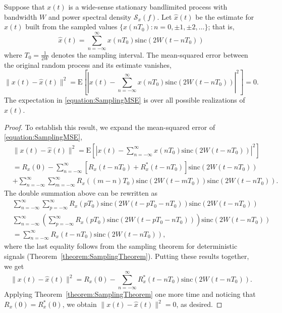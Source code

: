 \begin{theorem} \label{theorem:SamplingRandomSignals}
Suppose that $x(t)$ is a wide-sense stationary bandlimited process with bandwidth $W$ and power spectral density $\mathcal{S}_x (f)$.
Let $\hat{x}(t)$ be the estimate for $x(t)$ built from the sampled values $\{ x(nT_0) : n = 0, \pm 1, \pm 2, \ldots \}$; that is,
\begin{equation*}
\hat{x}(t) = \sum_{n=-\infty}^{\infty} x(nT_0) \mathrm{sinc} (2 W (t - nT_0))
\end{equation*}
where $T_0 = \frac{1}{2W}$ denotes the sampling interval.
The mean-squared error between the original random process and its estimate vanishes,
\begin{equation} \label{equation:SamplingMSE}
\| x(t) - \hat{x}(t) \|^2
= \mathrm{E} \left[ \left| x(t) - \sum_{n=-\infty}^{\infty}
x(nT_0) \mathrm{sinc} (2 W (t - nT_0)) \right|^2 \right] = 0 .
\end{equation}
The expectation in \eqref{equation:SamplingMSE} is over all possible realizations of $x(t)$.
\end{theorem}
\begin{proof}
To establish this result, we expand the mean-squared error of \eqref{equation:SamplingMSE},
\begin{equation*}
\begin{split}
&\| x(t) - \hat{x}(t) \|^2
= \mathrm{E} \left[ \left| x(t) - \sum_{n=-\infty}^{\infty} x(nT_0)
\mathrm{sinc}(2 W (t - nT_0)) \right|^2 \right] \\
&= R_x(0) - \sum_{n=-\infty}^{\infty} [ R_x(t-nT_0) + R_x^*(t-nT_0) ]
\mathrm{sinc}(2 W (t - nT_0)) \\
&+ \sum_{n=-\infty}^{\infty} \sum_{m=-\infty}^{\infty} R_x((m-n)T_0)
\mathrm{sinc}(2 W (t - mT_0)) \mathrm{sinc}(2 W (t - nT_0)) .
\end{split}
\end{equation*}
The double summation above can be rewritten as
\begin{equation*}
\begin{split}
&\sum_{n=-\infty}^{\infty} \sum_{p=-\infty}^{\infty} R_x(pT_0)
\mathrm{sinc}(2 W (t - pT_0 - nT_0)) \mathrm{sinc}(2 W (t - nT_0)) \\
&\sum_{n=-\infty}^{\infty} \left( \sum_{p=-\infty}^{\infty} R_x(pT_0)
\mathrm{sinc}(2 W (t - pT_0 - nT_0)) \right) \mathrm{sinc}(2 W (t - nT_0)) \\
&= \sum_{n=-\infty}^{\infty} R_x(t - nT_0) \mathrm{sinc}(2 W (t - nT_0)) ,
\end{split}
\end{equation*}
where the last equality follows from the sampling theorem for deterministic signals (Theorem~\ref{theorem:SamplingTheorem}).
Putting these results together, we get
\begin{equation*}
\| x(t) - \hat{x}(t) \|^2
= R_x(0) - \sum_{n=-\infty}^{\infty} R_x^*(t-nT_0) \mathrm{sinc}(2 W (t - nT_0)) .
\end{equation*}
Applying Theorem~\ref{theorem:SamplingTheorem} one more time and noticing that $R_x(0) = R_x^*(0)$, we obtain $\| x(t) - \hat{x}(t) \|^2 = 0$, as desired.
\end{proof}

